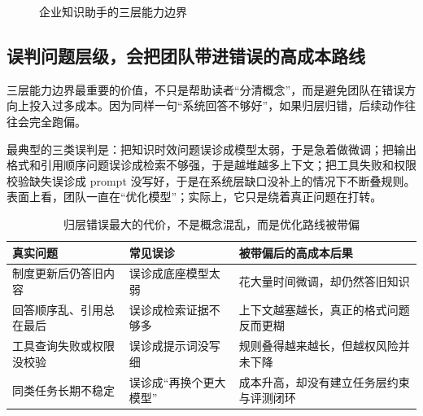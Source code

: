 \begin{figure}[H]
\centering
{}
\caption{企业知识助手的三层能力边界}
\label{fig:assistant-boundary}
\end{figure}

\subsection{误判问题层级，会把团队带进错误的高成本路线}
三层能力边界最重要的价值，不只是帮助读者“分清概念”，而是避免团队在错误方向上投入过多成本。因为同样一句“系统回答不够好”，如果归层归错，后续动作往往会完全跑偏。

最典型的三类误判是：把知识时效问题误诊成模型太弱，于是急着做微调；把输出格式和引用顺序问题误诊成检索不够强，于是越堆越多上下文；把工具失败和权限校验缺失误诊成 prompt 没写好，于是在系统层缺口没补上的情况下不断叠规则。表面上看，团队一直在“优化模型”；实际上，它只是绕着真正问题在打转。

\begin{table}[H]
\centering
\small
\begin{tabularx}{\textwidth}{>{\raggedright\arraybackslash}p{3.1cm}>{\raggedright\arraybackslash}p{3.3cm}>{\raggedright\arraybackslash}X}
\toprule
\textbf{真实问题} & \textbf{常见误诊} & \textbf{被带偏后的高成本后果} \\
\midrule
制度更新后仍答旧内容 & 误诊成底座模型太弱 & 花大量时间微调，却仍然答旧知识 \\
回答顺序乱、引用总在最后 & 误诊成检索证据不够多 & 上下文越塞越长，真正的格式问题反而更糊 \\
工具查询失败或权限没校验 & 误诊成提示词没写细 & 规则叠得越来越长，但越权风险并未下降 \\
同类任务长期不稳定 & 误诊成“再换个更大模型” & 成本升高，却没有建立任务层约束与评测闭环 \\
\bottomrule
\end{tabularx}
\caption{归层错误最大的代价，不是概念混乱，而是优化路线被带偏}
\label{tab:misdiagnosis-cost}
\end{table}

